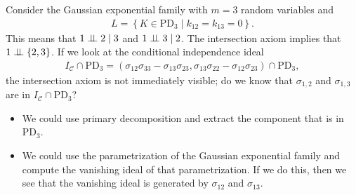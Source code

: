 \begin{eg}
  Consider the Gaussian exponential family with \( m = 3 \) random variables and 
  \begin{align*}
    L = \left\{ K \in \mathrm{PD}_3 \mid k_{12} = k_{13} = 0 \right\}.
  \end{align*}
  This means that \( 1 \perp \!\!\! \perp 2 \mid 3 \) and \( 1 \perp \!\!\! \perp 3 \mid 2 \). The intersection axiom implies that \( 1 \perp \!\!\! \perp \left\{ 2,3 \right\} \). If we look at the conditional independence ideal 
  \begin{align*}
    I_{\mathcal{C}}  \cap \mathrm{PD}_3 = (\sigma_{12}\sigma_{33} - \sigma_{13}\sigma_{23}, \sigma_{13}\sigma_{22} - \sigma_{12}\sigma_{23}) \cap \mathrm{PD}_3,
  \end{align*}
  the intersection axiom is not immediately visible; do we know that \( \sigma_{1,2}  \) and \( \sigma_{1,3} \) are in \( I_\mathcal{C} \cap \mathrm{PD}_3 \)?
  \begin{itemize}
    \item We could use primary decomposition and extract the component that is in \( \mathrm{PD}_3 \).
    \item We could use the parametrization of the Gaussian exponential family and compute the vanishing ideal of that parametrization. If we do this, then we see that the vanishing ideal is generated by \( \sigma_{12} \) and \( \sigma_{13} \).
  \end{itemize}
\end{eg}